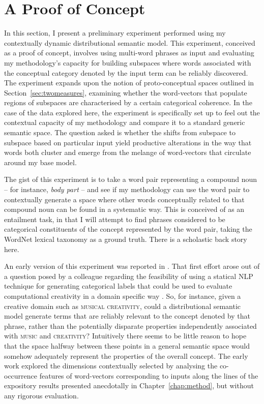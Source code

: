 \section{A Proof of Concept}
In this section, I present a preliminary experiment performed using my contextually dynamic distributional semantic model.  This experiment, conceived as a proof of concept, involves using multi-word phrases as input and evaluating my methodology's capacity for building subspaces where words associated with the conceptual category denoted by the input term can be reliably discovered.  The experiment expands upon the notion of proto-conceptual spaces outlined in Section~\ref{sec:twomeasures}, examining whether the word-vectors that populate regions of subspaces are characterised by a certain categorical coherence.  In the case of the data explored here, the experiment is specifically set up to feel out the contextual capacity of my methodology and compare it to a standard generic semantic space.  The question asked is whether the shifts from subspace to subspace based on particular input yield productive alterations in the way that words both cluster and emerge from the melange of word-vectors that circulate around my base model.

The gist of this experiment is to take a word pair representing a compound noun -- for instance, \emph{body part} -- and see if my methodology can use the word pair to contextually generate a space where other words conceptually related to that compound noun can be found in a systematic way.  This is conceived of as an entailment task, in that I will attempt to find phrases considered to be categorical constituents of the concept represented by the word pair, taking the WordNet lexical taxonomy as a ground truth.  There is a scholastic back story here.

An early version of this experiment was reported in \cite{AgresEA2015}.  That first effort arose out of a question posed by a colleague regarding the feasibility of using a statical NLP technique for generating categorical labels that could be used to evaluate computational creativity in a domain specific way \citep[for a psychological perspective on the difficulty of generating such terms in an objective way using human subjects, see][]{VanDerVeldeEA2015}.  So, for instance, given a creative domain such as \textsc{musical creativity}, could a distributional semantic model generate terms that are reliably relevant to the concept denoted by that phrase, rather than the potentially disparate properties independently associated with \textsc{music} and \textsc{creativity}?  Intuitively there seems to be little reason to hope that the space halfway between these points in a general semantic space would somehow adequately represent the properties of the overall concept.  The early work explored the dimensions contextually selected by analysing the co-occurrence features of word-vectors corresponding to inputs along the lines of the expository results presented anecdotally in Chapter~\ref{chap:method}, but without any rigorous evaluation.


